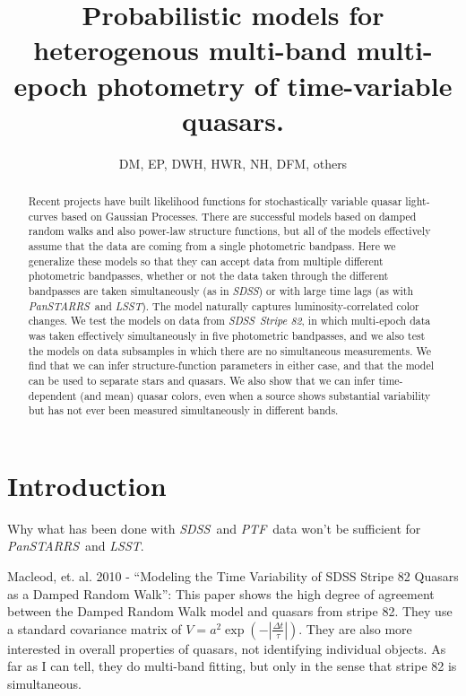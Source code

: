 \documentclass[letterpaper,12pt,preprint]{aastex}
\newcommand{\project}[1]{\textsl{#1}}
\newcommand{\sdss}{\project{SDSS}}
\newcommand{\lsst}{\project{LSST}}
\newcommand{\ptf}{\project{PTF}}
\newcommand{\panstarrs}{\project{PanSTARRS}}
\begin{document}
\title{Probabilistic models for heterogenous multi-band multi-epoch
  photometry of time-variable quasars.}
\author{DM, EP, DWH, HWR, NH, DFM, others}

\begin{abstract}
Recent projects have built likelihood functions for stochastically
variable quasar light-curves based on Gaussian Processes.  There are
successful models based on damped random walks and also power-law
structure functions, but all of the models effectively assume that the
data are coming from a single photometric bandpass.  Here we generalize
these models so that they can accept data from multiple different
photometric bandpasses, whether or not the data taken through the
different bandpasses are taken simultaneously (as in \sdss) or with
large time lags (as with \panstarrs\ and \lsst).  The model naturally
captures luminosity-correlated color changes.  We test the models on
data from \sdss\ \project{Stripe 82}, in which multi-epoch data was
taken effectively simultaneously in five photometric bandpasses, and
we also test the models on data subsamples in which there are no
simultaneous measurements.  We find that we can infer
structure-function parameters in either case, and that the model can
be used to separate stars and quasars.  We also show that we can infer
time-dependent (and mean) quasar colors, even when a source shows
substantial variability but has not ever been measured simultaneously
in different bands.
\end{abstract}


\section{Introduction}

Why what has been done with \sdss\ and \ptf\ data won't be sufficient
for \panstarrs\ and \lsst.

Macleod, et. al. 2010 - ``Modeling the Time Variability of SDSS Stripe
82 Quasars as a Damped Random Walk'': This paper shows the high degree
of agreement between the Damped Random Walk model and quasars from
stripe 82. They use a standard covariance matrix of $V = a^2 \exp
\left (-|\frac{\Delta t}{\tau}|\right)$. They are also more interested
in overall properties of quasars, not identifying individual
objects. As far as I can tell, they do multi-band fitting, but only in
the sense that stripe 82 is simultaneous.
\end{document}
